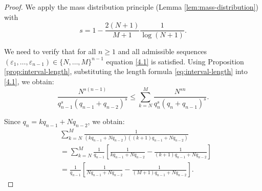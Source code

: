 \documentclass[12pt]{article}
\numberwithin{equation}{section}
\begin{document}
\begin{proof}
We apply the mass distribution principle (Lemma \ref{lem:mass-distribution}) with 
\[
s=1 - \frac{2(N+1)}{M+1}\frac{1}{\log(N+1)}.
\]

We need to verify that for all $n \geq 1$ and all admissible sequences $(\varepsilon_1, \ldots, \varepsilon_{n-1}) \in \{N, \ldots, M\}^{n-1}$ equation \eqref{4.1} is satisfied. 
Using Proposition \ref{prop:interval-length}, substituting the length formula \eqref{eq:interval-length} into \eqref{4.1}, we obtain:
\[
\frac{N^{s(n-1)}}{q_{n-1}^{s}\left(q_{n-1} + {q_{n-2}}\right)^s} \leq \sum_{k=N}^{M} \frac{N^{sn}}{q_n^{s} \left(q_n + {q_{n-1}}\right)^s}.
\]

Since $q_n = k q_{n-1} + N q_{n-2}$, we obtain:
%
\begin{align}
&\sum_{k=N}^{M} \frac{1}{\left(kq_{n-1} + {Nq_{n-2}}\right)\left((k+1)q_{n-1} + {Nq_{n-2}}\right)} \nonumber \\
&= 
\sum_{k=N}^{M} \frac{1}{q_{n-1}}\left[ \frac{1}{kq_{n-1} + {Nq_{n-2}}} - \frac{1}{(k+1)q_{n-1} + {Nq_{n-2}}} \right] \nonumber 
\\
&=  \frac{1}{q_{n-1}}\left[ \frac{1}{Nq_{n-1} + {Nq_{n-2}}} - \frac{1}{(M+1)q_{n-1} + {Nq_{n-2}}} \right]. 
\label{4.3}
\end{align}
%


\end{proof}
\end{document}
